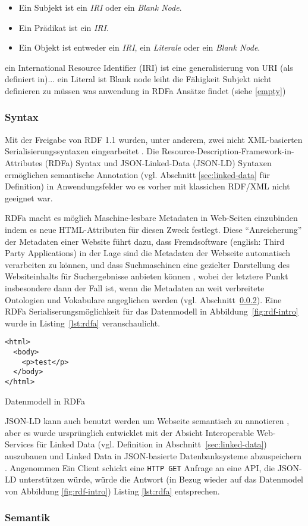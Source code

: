 \begin{itemize}
	\item Ein Subjekt ist ein \textit{IRI} oder ein \textit{Blank Node}.
	\item Ein Prädikat ist ein \textit{IRI}.
	\item Ein Objekt ist entweder ein \textit{IRI}, ein \textit{Literale} oder ein \textit{Blank Node}.
\end{itemize}
ein International Resource Identifier (IRI) ist eine generalisierung von URI (als definiert in)...
ein Literal ist
Blank node leiht die Fähigkeit Subjekt nicht definieren zu müssen was anwendung in RDFa Ansätze findet (siehe \ref{empty})

\subsubsection{Syntax}
\label{sec:syntax}
Mit der Freigabe von RDF 1.1 wurden, unter anderem, zwei nicht XML-basierten Serialisierungssyntaxen eingearbeitet \parencite[vgl.][Abs. 3]{Wood:14:WNR}. Die Resource-Description-Framework-in-Attributes (RDFa) Syntax und JSON-Linked-Data (JSON-LD) Syntaxen ermöglichen semantische Annotation (vgl. Abschnitt \ref{sec:linked-data} für Definition) in Anwendungsfelder wo es vorher mit klassichen RDF/XML nicht geeignet war. 

RDFa macht es möglich Maschine-lesbare Metadaten in Web-Seiten einzubinden indem es neue HTML-Attributen für diesen Zweck festlegt. Diese \hyphenquote{german}{Anreicherung} der Metadaten einer Website führt dazu, dass Fremdsoftware (english: Third Party Applications) in der Lage sind die Metadaten der Webseite automatisch verarbeiten zu können, und dass Suchmaschinen eine gezielter Darstellung des Websiteinhalts für Suchergebnisse anbieten können \parencite[vgl.][Abs. 2]{Schreiber:14:RP}, wobei der letztere Punkt insbesondere dann der Fall ist, wenn die Metadaten an weit verbreitete Ontologien und Vokabulare angeglichen werden (vgl. Abschnitt~\ref{sec:semantik}). Eine RDFa Serialiserungsmöglichkeit für das Datenmodell in Abbildung~\ref{fig:rdf-intro} wurde in Listing~\ref{lst:rdfa} veranschaulicht.
\begin{listing}[H]
\begin{verbatim}
<html>
  <body>
    <p>test</p>
  </body>
</html>
\end{verbatim}
\caption{Datenmodell in RDFa}
\label{lst:rdfa}
\end{listing}
JSON-LD kann auch benutzt werden um Webseite semantisch zu annotieren \parencite[vgl.]{Vincent2015}, aber es wurde ursprünglich entwicklet mit der Absicht Interoperable Web-Services für Linked Data (vgl. Definition in Abschnitt~\ref{sec:linked-data}) auszubauen und Linked Data in JSON-basierte Datenbanksysteme abzuspeichern \parencite[vgl.][Abs.~1]{Lanthaler:14:J}. Angenommen Ein Client schickt eine \texttt{HTTP GET} Anfrage an eine API, die JSON-LD unterstützen würde, würde die Antwort (in Bezug wieder auf das Datenmodel von Abbildung \ref{fig:rdf-intro}) Listing \ref{lst:rdfa} entsprechen.
\subsubsection{Semantik}
\label{sec:semantik}